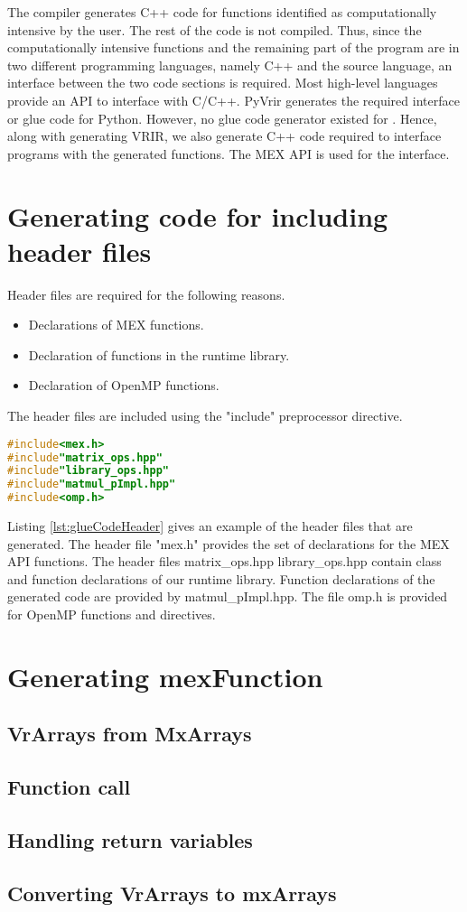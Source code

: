 The \velocty compiler generates C++ code for functions identified as computationally intensive by the user. The rest of the code is not compiled. Thus, since the computationally intensive functions and the remaining part of the program are in two different programming languages, namely C++ and the source language, an interface between the two code sections is required. Most high-level languages provide an API to interface with C/C++. PyVrir generates the required interface or glue code for Python. However, no glue code generator existed for \matlab.  Hence, along with generating VRIR, we also generate C++ code required to interface \matlab programs with the generated functions. The \matlab MEX API is used for the interface. 
\section{Generating code for including header files}
Header files are required for the following reasons.
\begin{itemize}
\item Declarations of MEX functions. 
\item Declaration of functions in the runtime library. 
\item Declaration of OpenMP functions.
\end{itemize}
The header files are included using the "include" preprocessor directive. 
\begin{lstlisting}[float,language=c,caption={Example of header files in glue code},label={lst:glueCodeHeader}]
#include<mex.h>
#include"matrix_ops.hpp"
#include"library_ops.hpp"
#include"matmul_pImpl.hpp"
#include<omp.h>
\end{lstlisting}
Listing \ref{lst:glueCodeHeader} gives an example of the header files that are generated. The header file "mex.h" provides the set of declarations for the MEX API functions. The header files matrix\_ops.hpp library\_ops.hpp contain class and function declarations of our runtime library. Function declarations of the generated code are provided by matmul\_pImpl.hpp. The file omp.h is provided for OpenMP functions and directives. 
\section{Generating mexFunction}
\subsection{VrArrays from MxArrays}
\subsection{Function call}
\subsection{Handling return variables}
\subsection{Converting VrArrays to mxArrays}
